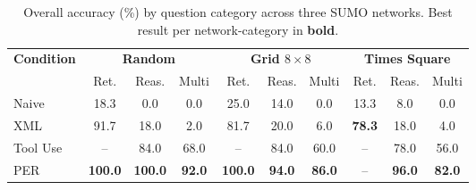\begin{table}[t]
\centering
\caption{Overall accuracy (\%) by question category across three SUMO networks.
Best result per network-category in \textbf{bold}.}
\label{tab:overall_by_category}
\setlength{\tabcolsep}{4pt}
\scriptsize
\begin{tabular}{@{}l|ccc|ccc|ccc@{}}
\toprule
\multirow{2}{*}{\textbf{Condition}} & \multicolumn{3}{c|}{\textbf{Random}} & \multicolumn{3}{c|}{\textbf{Grid $8\times8$}} & \multicolumn{3}{c}{\textbf{Times Square}} \\
\cmidrule(lr){2-4} \cmidrule(lr){5-7} \cmidrule(lr){8-10}
 & Ret. & Reas. & Multi & Ret. & Reas. & Multi & Ret. & Reas. & Multi \\
\midrule
Naive & 18.3 & 0.0 & 0.0 & 25.0 & 14.0 & 0.0 & 13.3 & 8.0 & 0.0 \\
XML & 91.7 & 18.0 & 2.0 & 81.7 & 20.0 & 6.0 & \textbf{78.3} & 18.0 & 4.0 \\
Tool Use & -- & 84.0 & 68.0 & -- & 84.0 & 60.0 & -- & 78.0 & 56.0 \\
\midrule
PER & \textbf{100.0} & \textbf{100.0} & \textbf{92.0} & \textbf{100.0} & \textbf{94.0} & \textbf{86.0} & -- & \textbf{96.0} & \textbf{82.0} \\
\bottomrule
\end{tabular}
\end{table}
